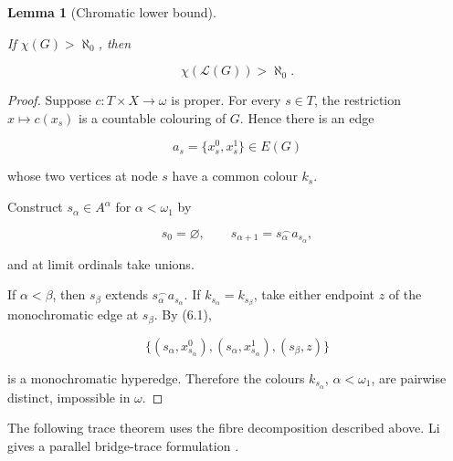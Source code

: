 \documentclass[a4paper,11pt,reqno]{amsart}
\theoremstyle{plain}
\newtheorem{lemma}[theorem]{Lemma}
\theoremstyle{definition}
\theoremstyle{remark}
\begin{document}
\begin{lemma}[Chromatic lower bound]\label{lemma-6.2-chromatic-lower-bound}

If \(\chi(G)>\aleph_0\), then

\[
\chi(\mathcal L(G))>\aleph_0.
\]

\end{lemma}
\begin{proof}
Suppose \(c:T\times X\to\omega\) is proper. For every \(s\in T\), the restriction \(x\mapsto c(x_s)\) is a countable colouring of \(G\). Hence there is an edge

\[
a_s=\{x_s^0,x_s^1\}\in E(G)
\]

whose two vertices at node \(s\) have a common colour \(k_s\).

Construct \(s_\alpha\in A^\alpha\) for \(\alpha<\omega_1\) by

\[
s_0=\varnothing,
\qquad s_{\alpha+1}=s_\alpha^\frown a_{s_\alpha},
\]

and at limit ordinals take unions.

If \(\alpha<\beta\), then \(s_\beta\) extends \(s_\alpha^\frown a_{s_\alpha}\). If \(k_{s_\alpha}=k_{s_\beta}\), take either endpoint \(z\) of the monochromatic edge at \(s_\beta\). By (6.1),

\[
\{(s_\alpha,x_{s_\alpha}^0),
  (s_\alpha,x_{s_\alpha}^1),
  (s_\beta,z)\}
\]

is a monochromatic hyperedge. Therefore the colours \(k_{s_\alpha}\), \(\alpha<\omega_1\), are pairwise distinct, impossible in \(\omega\).
\end{proof}

The following trace theorem uses the fibre decomposition described above.
Li gives a parallel bridge-trace formulation \citep[Theorem~4.6]{li2026}.
\end{document}

